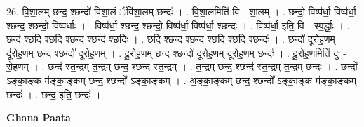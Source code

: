 \documentclass[17pt]{extarticle}
\begin{document}
26. वि॒शा॒लम् छन्द॒ श्छन्दो॑ विशा॒लं ॅवि॑शा॒लम् छन्दः॑ । . वि॒शा॒लमिति॑ वि - शा॒लम् । . छन्दो॒ विष्प॑र्धा॒ विष्प॑र्धा॒ श्छन्द॒ श्छन्दो॒ विष्प॑र्धाः । . विष्प॑र्धा॒ श्छन्द॒ श्छन्दो॒ विष्प॑र्धा॒ विष्प॑र्धा॒ श्छन्दः॑ । . विष्प॑र्धा॒ इति॒ वि - स्प॒र्द्धाः॒ । . छन्द॑ श्छ॒दि श्छ॒दि श्छन्द॒ श्छन्द॑ श्छ॒दिः । . छ॒दि श्छन्द॒ श्छन्द॑ श्छ॒दि श्छ॒दि श्छन्दः॑ । . छन्दो॑ दूरोह॒णम् दू॑रोह॒णम् छन्द॒ श्छन्दो॑ दूरोह॒णम् । . दू॒रो॒ह॒णम् छन्द॒ श्छन्दो॑ दूरोह॒णम् दू॑रोह॒णम् छन्दः॑ । . दू॒रो॒ह॒णमिति॑ दुः - रो॒ह॒णम् । . छन्द॑ स्त॒न्द्रम् त॒न्द्रम् छन्द॒ श्छन्द॑ स्त॒न्द्रम् । . त॒न्द्रम् छन्द॒ श्छन्द॑ स्त॒न्द्रम् त॒न्द्रम् छन्दः॑ । . छन्दो᳚ ऽङ्का॒ङ्क म॑ङ्का॒ङ्कम् छन्द॒ श्छन्दो᳚ ऽङ्का॒ङ्कम् । . अ॒ङ्का॒ङ्कम् छन्द॒ श्छन्दो᳚ ऽङ्का॒ङ्क म॑ङ्का॒ङ्कम् छन्दः॑ । . छन्द॒ इति॒ छन्दः॑ । \newline

\textbf{Ghana Paata } \newline
\end{document}
